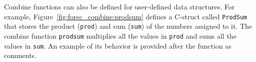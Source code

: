 %	
%			
%			
%	
%			
%			
%
%			
%			
%
%			
%			
%

Combine functions can also be defined for 
user-defined data structures. For example,
Figure~\ref{fig:forec_combine:prodsum} defines a C-struct
called \verb$ProdSum$ that stores the product (\verb$prod$)
and sum (\verb$sum$) of the numbers assigned to it. The
combine function \verb$prodsum$ multiplies all the values in
\verb$prod$ and sums all the values in \verb$sum$. An
example of its behavior is provided after the function as
comments. 

